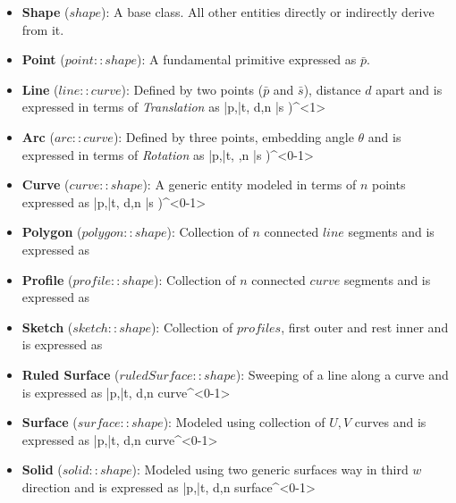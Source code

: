 \begin{itemize}[noitemsep,topsep=2pt,parsep=2pt,partopsep=2pt,label={},leftmargin=*]

\item {\bf Shape} ($shape$): A base class. All other entities directly or indirectly derive from it.

\item {\bf Point} ($point::shape$): A fundamental primitive expressed as $\bar{p}$. 	

\item {\bf Line} ($line::curve$): Defined by two points ($\bar{p}$ and $\bar{s}$), distance $d$ apart and is expressed in terms of {\em Translation} as  {\bar{p},\bar{t}, d,n} {\bar{s} )^{<1>} }	

\item  {\bf Arc} ($arc::curve$): Defined by three points, embedding angle $\theta$ and is expressed in terms of {\em Rotation} as  {\bar{p},\bar{t}, \theta,n} {\bar{s} )^{<0-1>}}	


\item {\bf Curve} ($curve::shape$): A generic entity modeled in terms of $n$ points expressed as  {\bar{p},\bar{t}, d,n} {\bar{s} )^{<0-1>}} 

\item {\bf Polygon} ($polygon::shape$): Collection of $n$ connected $line$ segments and is expressed as 	

\item {\bf Profile} ($profile::shape$): Collection of $n$ connected $curve$ segments and  is expressed as  

\item {\bf Sketch} ($sketch::shape$): Collection of $profiles$, first outer and rest  inner  and is expressed as 		

\item {\bf Ruled Surface} ($ruledSurface::shape$): Sweeping of a line along a curve and is expressed as  {\bar{p},\bar{t}, d,n} {curve{^{<0-1>} }}	

\item {\bf Surface} ($surface::shape$): Modeled using collection of $U,V$ curves	and is expressed as  {\bar{p},\bar{t}, d,n} {curve{^{<0-1>} }}   

\item {\bf Solid} ($solid::shape$): Modeled using two generic surfaces way in third $w$ direction and is expressed as  {\bar{p},\bar{t}, d,n} {surface{^{<0-1>} }} 	

\end{itemize}

